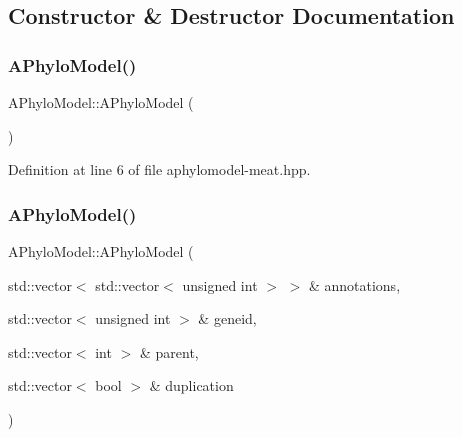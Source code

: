 \subsection{Constructor \& Destructor Documentation}
\mbox{\label{class_a_phylo_model_a5055699d05235bbefb283298d9dee75d}} 
\subsubsection{\texorpdfstring{A\+Phylo\+Model()}{APhyloModel()}\hspace{0.1cm}{\footnotesize\ttfamily [1/2]}}
{\footnotesize\ttfamily A\+Phylo\+Model\+::\+A\+Phylo\+Model (\begin{DoxyParamCaption}{ }\end{DoxyParamCaption})\hspace{0.3cm}{\ttfamily [inline]}}



Definition at line 6 of file aphylomodel-\/meat.\+hpp.

\mbox{\label{class_a_phylo_model_a4c0005c106a12f1b11ccd9f5ceac8d9c}} 
\subsubsection{\texorpdfstring{A\+Phylo\+Model()}{APhyloModel()}\hspace{0.1cm}{\footnotesize\ttfamily [2/2]}}
{\footnotesize\ttfamily A\+Phylo\+Model\+::\+A\+Phylo\+Model (\begin{DoxyParamCaption}\item[{std\+::vector$<$ std\+::vector$<$ unsigned int $>$ $>$ \&}]{annotations,  }\item[{std\+::vector$<$ unsigned int $>$ \&}]{geneid,  }\item[{std\+::vector$<$ int $>$ \&}]{parent,  }\item[{std\+::vector$<$ bool $>$ \&}]{duplication }\end{DoxyParamCaption})\hspace{0.3cm}{\ttfamily [inline]}}



